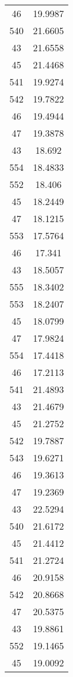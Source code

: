\begin{tabular}[c]{|c|c|}
        46&   19.9987\\
       540&   21.6605\\
        43&   21.6558\\
        45&   21.4468\\
       541&   19.9274\\
       542&   19.7822\\
        46&   19.4944\\
        47&   19.3878\\
        43&    18.692\\
       554&   18.4833\\
       552&    18.406\\
        45&   18.2449\\
        47&   18.1215\\
       553&   17.5764\\
        46&    17.341\\
        43&   18.5057\\
       555&   18.3402\\
       553&   18.2407\\
        45&   18.0799\\
        47&   17.9824\\
       554&   17.4418\\
        46&   17.2113\\
       541&   21.4893\\
        43&   21.4679\\
        45&   21.2752\\
       542&   19.7887\\
       543&   19.6271\\
        46&   19.3613\\
        47&   19.2369\\
        43&   22.5294\\
       540&   21.6172\\
        45&   21.4412\\
       541&   21.2724\\
        46&   20.9158\\
       542&   20.8668\\
        47&   20.5375\\
        43&   19.8861\\
       552&   19.1465\\
        45&   19.0092\\

\end{tabular}
